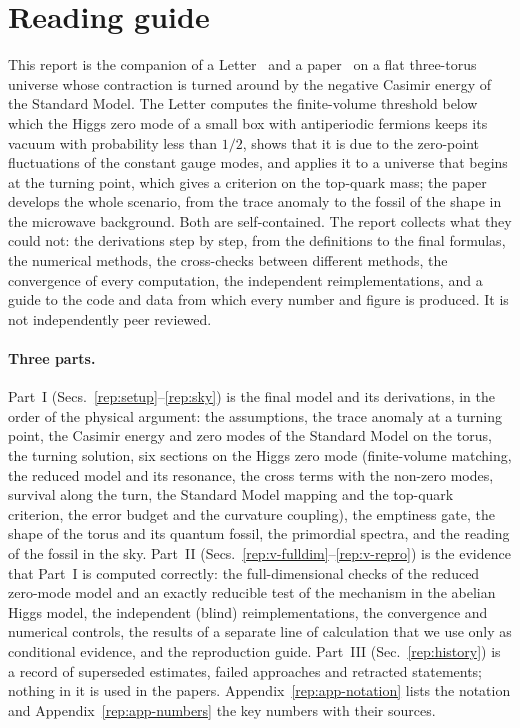\section*{Reading guide}\label{rep:guide}

This report is the companion of a Letter~\cite{v12PRL} and a paper~\cite{v12PRD} on a flat three-torus universe whose contraction is turned around by the negative Casimir energy of the Standard Model.
The Letter computes the finite-volume threshold below which the Higgs zero mode of a small box with antiperiodic fermions keeps its vacuum with probability less than $1/2$, shows that it is due to the zero-point fluctuations of the constant gauge modes, and applies it to a universe that begins at the turning point, which gives a criterion on the top-quark mass; the paper develops the whole scenario, from the trace anomaly to the fossil of the shape in the microwave background.
Both are self-contained.
The report collects what they could not: the derivations step by step, from the definitions to the final formulas, the numerical methods, the cross-checks between different methods, the convergence of every computation, the independent reimplementations, and a guide to the code and data from which every number and figure is produced.
It is not independently peer reviewed.

\paragraph{Three parts.}
Part~I (Secs.~\ref{rep:setup}--\ref{rep:sky}) is the final model and its derivations, in the order of the physical argument: the assumptions, the trace anomaly at a turning point, the Casimir energy and zero modes of the Standard Model on the torus, the turning solution, six sections on the Higgs zero mode (finite-volume matching, the reduced model and its resonance, the cross terms with the non-zero modes, survival along the turn, the Standard Model mapping and the top-quark criterion, the error budget and the curvature coupling), the emptiness gate, the shape of the torus and its quantum fossil, the primordial spectra, and the reading of the fossil in the sky.
Part~II (Secs.~\ref{rep:v-fulldim}--\ref{rep:v-repro}) is the evidence that Part~I is computed correctly: the full-dimensional checks of the reduced zero-mode model and an exactly reducible test of the mechanism in the abelian Higgs model, the independent (blind) reimplementations, the convergence and numerical controls, the results of a separate line of calculation that we use only as conditional evidence, and the reproduction guide.
Part~III (Sec.~\ref{rep:history}) is a record of superseded estimates, failed approaches and retracted statements; nothing in it is used in the papers.
Appendix~\ref{rep:app-notation} lists the notation and Appendix~\ref{rep:app-numbers} the key numbers with their sources.

